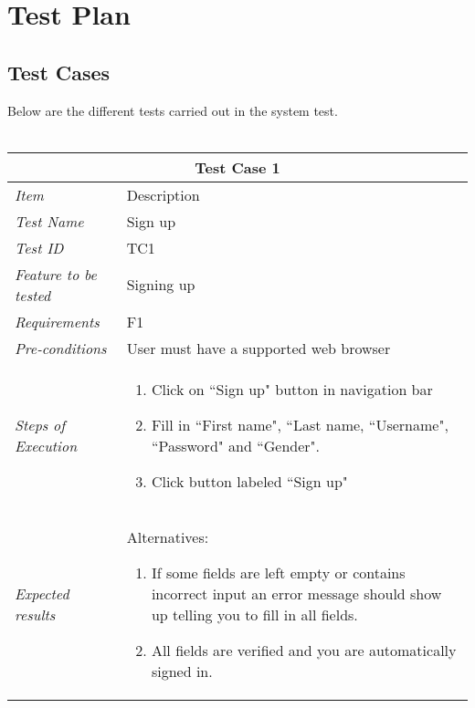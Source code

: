


\chapter{Test Plan}
\label{chap:TestingTPlan}


\section{Test Cases}
\label{sec:TestCases}

Below are the different tests carried out in the system test. \\ \\
%
\begin{minipage}{\linewidth}
\setlength{\tabcolsep}{15pt}
\centering
{}
\begin{tabular}{ |l|p{70mm}| }
	\hline
	\multicolumn{2}{|c|}{\cellcolor{gray!25} \textbf{Test Case 1}} \\
	\hline
	\it{\cellcolor{gray!25}Item} & {\cellcolor{gray!25} Description } \\
	\hline
	\it{\cellcolor{gray!25}Test Name } & Sign up \\ \hline
	\it{\cellcolor{gray!25}Test ID} & TC1 \\ \hline
	\it{\cellcolor{gray!25}Feature to be tested} & Signing up \\ \hline
	\it{\cellcolor{gray!25}Requirements} & F1  \\ \hline
	\it{\cellcolor{gray!25}Pre-conditions} & User must have a supported web browser  \\ \hline
	\it{\cellcolor{gray!25}Steps of Execution} & \begin{enumerate}
	                                       \item Click on ``Sign up" button in navigation bar
	                                       \item Fill in ``First name", ``Last name, ``Username", ``Password" and ``Gender".
	                                       \item Click button labeled ``Sign up"
	                                     \end{enumerate} \\ \hline
	\it{\cellcolor{gray!25}Expected results} & Alternatives: 
	\begin{enumerate}[label=\alph*)]
	                                       \item If some fields are left empty or contains incorrect input an error message should show up telling you to fill in all fields.
	                                       \item All fields are verified and you are automatically signed in.
	                                     \end{enumerate} \\
	\hline
\end{tabular}
\medskip
\end{minipage}
